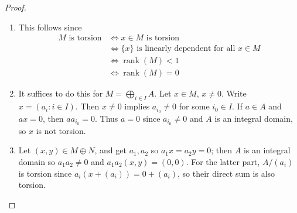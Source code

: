 \documentclass[11pt, a4paper]{memoir}
\theoremstyle{change}
\theoremstyle{plain}
\theoremstyle{nonumberplain}
\newtheorem{proof}{Proof}
\DeclareMathOperator{\rank}{rank}
\numberwithin{equation}{section}
\begin{document}
\begin{proof}
    \begin{enumerate}[nolistsep,label=(\roman*)]
        \item This follows since
            \begin{align*}
                \text{$M$ is torsion}&\iff\text{$x\in M$ is torsion}\\
                                     &\iff\text{$\{x\}$ is linearly dependent for all $x\in M$}\\
                                     &\iff\rank(M)<1\\
                                     &\iff\rank(M)=0
                \end{align*}
        \item It suffices to do this for $M=\bigoplus_{i\in I}A$.
            Let $x\in M$, $x\neq 0$.
            Write $x=(a_i:i\in I)$.
            Then $x\neq 0$ implies $a_{i_0}\neq 0$ for some $i_0\in I$.
            If $a\in A$ and $ax=0$, then $aa_{i_0}=0$.
            Thus $a=0$ since $a_{i_0}\neq 0$ and $A$ is an integral domain, so $x$ is not torsion.
        \item Let $(x,y)\in M\oplus N$, and get $a_1,a_2$ so $a_1x=a_2y=0$; then $A$ is an integral domain so $a_1a_2\neq 0$ and $a_1a_2(x,y)=(0,0)$.
            For the latter part, $A/(a_i)$ is torsion since $a_i(x+(a_i))=0+(a_i)$, so their direct sum is also torsion.
    \end{enumerate}
\end{proof}
\end{document}

